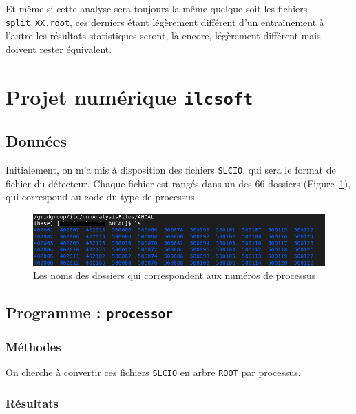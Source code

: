 \documentclass[10pt,a4paper]{report}
\newcommand{\qqs}{quelque soit\xspace}
\newcommand{\ROOT}{\texttt{ROOT}\xspace}
\newcommand{\SLCIO}{\texttt{SLCIO}\xspace}
\newcommand{\ilcsoft}{\texttt{ilcsoft}\xspace}
\newcommand{\processor}{\texttt{processor}\xspace}
\begin{document}
Et même si cette analyse sera toujours la même \qqs les fichiers \texttt{split\_XX.root}, ces derniers étant légèrement différent d'un entraînement à l'autre les résultats statistiques seront, là encore, légèrement différent mais doivent rester équivalent.

\section{Projet numérique \ilcsoft}

\subsection{Données}
Initialement, on m'a mis à disposition des fichiers \SLCIO, qui sera le format de fichier du détecteur.
Chaque fichier est rangés dans un des 66 dossiers (Figure~\ref{listeProcessus}), qui correspond au code du type de processus.

\begin{figure}[h!]
	\includegraphics[width=\textwidth]{../img/listeProcessus.png} 
	\caption{Les noms des dossiers qui correspondent aux numéros de processus}
	\label{listeProcessus}
\end{figure}


\subsection{Programme : \processor}

\subsubsection{Méthodes}

On cherche à convertir ces fichiers \SLCIO en arbre \ROOT par processus.

\subsubsection{Résultats}
\end{document}
